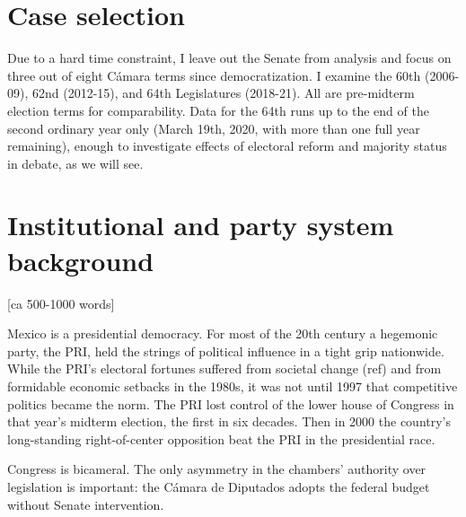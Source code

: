 \documentclass[letter,12pt]{article}
\begin{document}
\section{Case selection}

Due to a hard time constraint, I leave out the Senate from analysis and focus on three out of eight Cámara terms since democratization. I examine the 60th (2006-09), 62nd (2012-15), and 64th Legislatures (2018-21). All are pre-midterm election terms for comparability. Data for the 64th runs up to the end of the second ordinary year only (March 19th, 2020, with more than one full year remaining), enough to investigate effects of electoral reform and majority status in debate, as we will see. 



\section{Institutional and party system background} [ca 500-1000 words]

Mexico is a presidential democracy. For most of the 20th century a hegemonic party, the PRI, held the strings of political influence in a tight grip nationwide. While the PRI's electoral fortunes suffered from societal change \citep{scott.1959}(ref) and from formidable economic setbacks in the 1980s, it was not until 1997 that competitive politics became the norm. The PRI lost control of the lower house of Congress in that year's midterm election, the first in six decades. Then in 2000 the country's long-standing right-of-center opposition beat the PRI in the presidential race. 

Congress is bicameral. The only asymmetry in the chambers' authority over legislation is important: the Cámara de Diputados adopts the federal budget without Senate intervention. 
\end{document}
